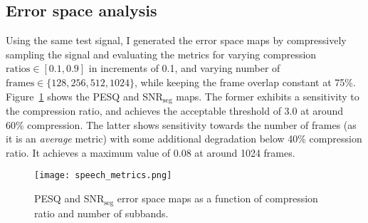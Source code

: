\subsection{Error space analysis}
\label{ssec:audio-speech-error}
Using the same test signal, I generated the error space maps by compressively sampling the signal and evaluating the metrics for varying compression $\textrm{ratios} \in [0.1, 0.9]$ in increments of 0.1, and varying number of $\textrm{frames} \in \{128, 256, 512, 1024\}$, while keeping the frame overlap constant at 75\%. Figure~\ref{fig:speech-error} shows the PESQ and SNR$_\mathrm{seg}$ maps. The former exhibits a sensitivity to the compression ratio, and achieves the acceptable threshold of 3.0 at around 60\% compression. The latter shows sensitivity towards the number of frames (as it is an \textit{average} metric) with some additional degradation below 40\% compression ratio. It achieves a maximum value of 0.08 at around 1024 frames.

\begin{figure}[htb]
	\centering
	\texttt{[image: speech\_metrics.png]}
	\caption{PESQ and SNR$_\mathrm{seg}$ error space maps as a function of compression ratio and number of subbands.}
	\label{fig:speech-error}
\end{figure}